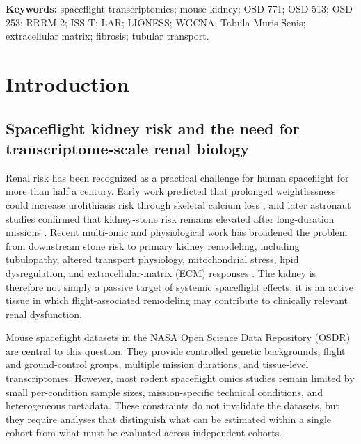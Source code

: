 \documentclass[11pt]{article}
\begin{document}
\vspace{0.3em}
\noindent\textbf{Keywords:} spaceflight transcriptomics; mouse kidney; OSD-771; OSD-513; OSD-253; RRRM-2; ISS-T; LAR; LIONESS; WGCNA; Tabula Muris Senis; extracellular matrix; fibrosis; tubular transport.

\clearpage
\tableofcontents
\clearpage

\section{Introduction}

\subsection{Spaceflight kidney risk and the need for transcriptome-scale renal biology}

Renal risk has been recognized as a practical challenge for human spaceflight for more than half a century. Early work predicted that prolonged weightlessness could increase urolithiasis risk through skeletal calcium loss \citep{cockett1962astronautical}, and later astronaut studies confirmed that kidney-stone risk remains elevated after long-duration missions \citep{pietrzyk2007renal,smith2014men,kassemi2021numerical}. Recent multi-omic and physiological work has broadened the problem from downstream stone risk to primary kidney remodeling, including tubulopathy, altered transport physiology, mitochondrial stress, lipid dysregulation, and extracellular-matrix (ECM) responses \citep{daSilveira2020comprehensive,siew2024cosmic,chouker2025impact}. The kidney is therefore not simply a passive target of systemic spaceflight effects; it is an active tissue in which flight-associated remodeling may contribute to clinically relevant renal dysfunction.

Mouse spaceflight datasets in the NASA Open Science Data Repository (OSDR) are central to this question. They provide controlled genetic backgrounds, flight and ground-control groups, multiple mission durations, and tissue-level transcriptomes. However, most rodent spaceflight omics studies remain limited by small per-condition sample sizes, mission-specific technical conditions, and heterogeneous metadata. These constraints do not invalidate the datasets, but they require analyses that distinguish what can be estimated within a single cohort from what must be evaluated across independent cohorts.
\end{document}
